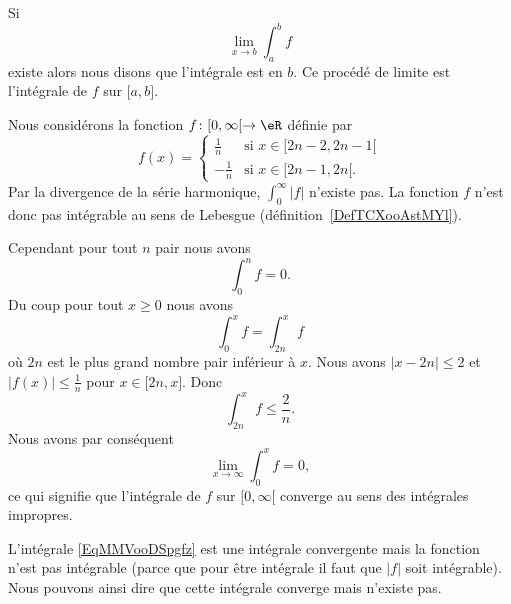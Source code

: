 \begin{definition}      \label{DEFooINPOooWWObEz}
    Si
    \begin{equation}
        \lim_{x\to b} \int_a^bf
    \end{equation}
    existe alors nous disons que l'intégrale est  en \( b\). Ce procédé de limite est l'intégrale  de \( f\) sur \( \mathopen[ a , b \mathclose]\).
\end{definition}

\begin{example}
    Nous considérons la fonction \( f\colon \mathopen[ 0 , \infty [\to \eR\) définie par
    \begin{equation}
        f(x)=\begin{cases}
            \frac{1}{ n }    &   \text{si } x\in\mathopen[ 2n-2 , 2n-1 [\\
                -\frac{1}{ n }    &    \text{si } x\in\mathopen[ 2n-1 , 2n [\text{.}
        \end{cases}
    \end{equation}
    Par la divergence de la série harmonique, \( \int_{0}^{\infty}| f |\) n'existe pas. La fonction \( f\) n'est donc pas intégrable au sens de Lebesgue (définition~\ref{DefTCXooAstMYl}).

    Cependant pour tout \( n\) pair nous avons
    \begin{equation}
        \int_0^nf=0.
    \end{equation}
    Du coup pour tout \( x\geq 0\) nous avons
    \begin{equation}
        \int_0^xf=\int_{2n}^xf
    \end{equation}
    où \( 2n\) est le plus grand nombre pair inférieur à \( x\). Nous avons \( | x-2n |\leq 2\) et \( | f(x) |\leq \frac{1}{ n }\) pour \( x\in\mathopen[ 2n , x \mathclose]\). Donc
    \begin{equation}
        \int_{2n}^xf\leq \frac{ 2 }{ n }.
    \end{equation}
    Nous avons par conséquent
    \begin{equation}
        \lim_{x\to \infty} \int_0^xf=0,
    \end{equation}
    ce qui signifie que l'intégrale de \( f\) sur \( \mathopen[ 0 , \infty [\) converge au sens des intégrales impropres.
\end{example}


L'intégrale \eqref{EqMMVooDSpgfz} est une intégrale convergente mais la fonction n'est pas intégrable (parce que pour être intégrale il faut que \( | f |\) soit intégrable). Nous pouvons ainsi dire que cette intégrale converge mais n'existe pas.

